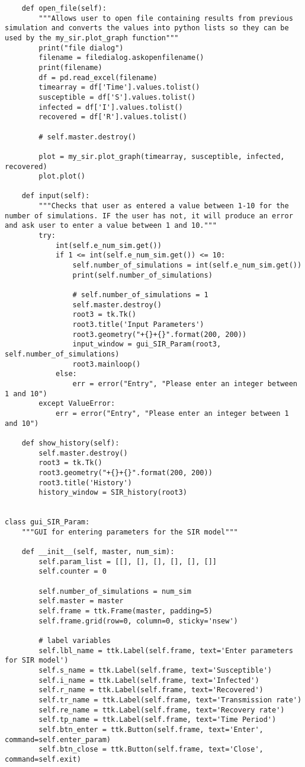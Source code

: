 \documentclass[11pt, a4paper]{article}
\begin{document}
\begin{lstlisting}
    def open_file(self):
        """Allows user to open file containing results from previous simulation and converts the values into python lists so they can be used by the my_sir.plot_graph function"""
        print("file dialog")
        filename = filedialog.askopenfilename()
        print(filename)
        df = pd.read_excel(filename)
        timearray = df['Time'].values.tolist()
        susceptible = df['S'].values.tolist()
        infected = df['I'].values.tolist()
        recovered = df['R'].values.tolist()

        # self.master.destroy()

        plot = my_sir.plot_graph(timearray, susceptible, infected, recovered)
        plot.plot()

    def input(self):
        """Checks that user as entered a value between 1-10 for the number of simulations. IF the user has not, it will produce an error and ask user to enter a value between 1 and 10."""
        try:
            int(self.e_num_sim.get())
            if 1 <= int(self.e_num_sim.get()) <= 10:
                self.number_of_simulations = int(self.e_num_sim.get())
                print(self.number_of_simulations)

                # self.number_of_simulations = 1
                self.master.destroy()
                root3 = tk.Tk()
                root3.title('Input Parameters')
                root3.geometry("+{}+{}".format(200, 200))
                input_window = gui_SIR_Param(root3, self.number_of_simulations)
                root3.mainloop()
            else:
                err = error("Entry", "Please enter an integer between 1 and 10")
        except ValueError:
            err = error("Entry", "Please enter an integer between 1 and 10")

    def show_history(self):
        self.master.destroy()
        root3 = tk.Tk()
        root3.geometry("+{}+{}".format(200, 200))
        root3.title('History')
        history_window = SIR_history(root3)


class gui_SIR_Param:
    """GUI for entering parameters for the SIR model"""

    def __init__(self, master, num_sim):
        self.param_list = [[], [], [], [], [], []]
        self.counter = 0

        self.number_of_simulations = num_sim
        self.master = master
        self.frame = ttk.Frame(master, padding=5)
        self.frame.grid(row=0, column=0, sticky='nsew')

        # label variables
        self.lbl_name = ttk.Label(self.frame, text='Enter parameters for SIR model')
        self.s_name = ttk.Label(self.frame, text='Susceptible')
        self.i_name = ttk.Label(self.frame, text='Infected')
        self.r_name = ttk.Label(self.frame, text='Recovered')
        self.tr_name = ttk.Label(self.frame, text='Transmission rate')
        self.re_name = ttk.Label(self.frame, text='Recovery rate')
        self.tp_name = ttk.Label(self.frame, text='Time Period')
        self.btn_enter = ttk.Button(self.frame, text='Enter', command=self.enter_param)
        self.btn_close = ttk.Button(self.frame, text='Close', command=self.exit)


\end{lstlisting}
\end{document}
